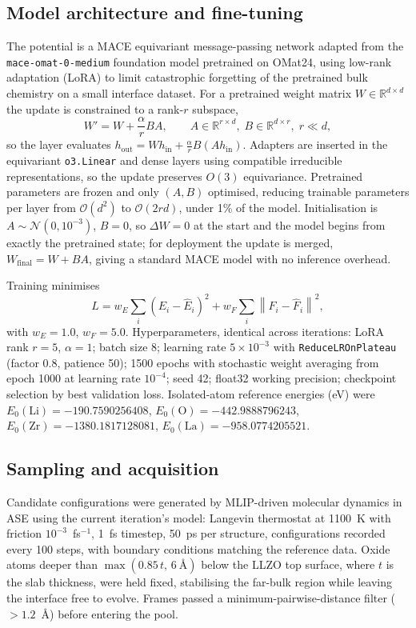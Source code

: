 \documentclass[11pt]{article}
\begin{document}
\subsection{Model architecture and fine-tuning}
The potential is a MACE equivariant message-passing
network\citep{batatia2023mace} adapted from the \texttt{mace-omat-0-medium}
foundation model pretrained on OMat24\citep{omat24}, using low-rank adaptation
(LoRA)\citep{LoRA2021} to limit catastrophic forgetting of the pretrained bulk
chemistry on a small interface dataset. For a pretrained weight matrix
$W\in\mathbb{R}^{d\times d}$ the update is constrained to a rank-$r$ subspace,
\begin{equation}
W' = W + \frac{\alpha}{r}BA,
\qquad A\in\mathbb{R}^{r\times d},\; B\in\mathbb{R}^{d\times r},\; r\ll d,
\end{equation}
so the layer evaluates
$h_{\mathrm{out}} = Wh_{\mathrm{in}} + \tfrac{\alpha}{r}B(Ah_{\mathrm{in}})$.
Adapters are inserted in the equivariant \texttt{o3.Linear} and dense layers
using compatible irreducible representations, so the update preserves $O(3)$
equivariance. Pretrained parameters are frozen and only $(A,B)$ optimised,
reducing trainable parameters per layer from $\mathcal{O}(d^2)$ to
$\mathcal{O}(2rd)$, under 1\% of the model. Initialisation is
$A\sim\mathcal{N}(0,10^{-3})$, $B=0$, so $\Delta W=0$ at the start and the model
begins from exactly the pretrained state; for deployment the update is merged,
$W_{\mathrm{final}} = W+BA$, giving a standard MACE model with no inference
overhead.

Training minimises
\begin{equation}
L = w_E\sum_i\left(E_i-\hat{E}_i\right)^2
  + w_F\sum_i\left\|F_i-\hat{F}_i\right\|^2 ,
\end{equation}
with $w_E=1.0$, $w_F=5.0$. Hyperparameters, identical across iterations: LoRA
rank $r=5$, $\alpha=1$; batch size 8; learning rate $5\times10^{-3}$ with
\texttt{ReduceLROnPlateau} (factor 0.8, patience 50); 1500 epochs with
stochastic weight averaging from epoch 1000 at learning rate $10^{-4}$; seed
42; float32 working precision; checkpoint selection by best validation loss.
Isolated-atom reference energies (eV) were
$E_0(\mathrm{Li})=-190.7590256408$, $E_0(\mathrm{O})=-442.9888796243$,
$E_0(\mathrm{Zr})=-1380.1817128081$, $E_0(\mathrm{La})=-958.0774205521$.

\subsection{Sampling and acquisition}
Candidate configurations were generated by MLIP-driven molecular dynamics in
ASE using the current iteration's model: Langevin thermostat at 1100~K with
friction $10^{-3}$~fs$^{-1}$, 1~fs timestep, 50~ps per structure, configurations
recorded every 100 steps, with boundary conditions matching the reference data.
Oxide atoms deeper than $\max(0.85\,t,\,6~\text{\AA})$ below the LLZO top
surface, where $t$ is the slab thickness, were held fixed, stabilising the
far-bulk region while leaving the interface free to evolve. Frames passed a
minimum-pairwise-distance filter ($>1.2$~\AA) before entering the pool.
\end{document}
